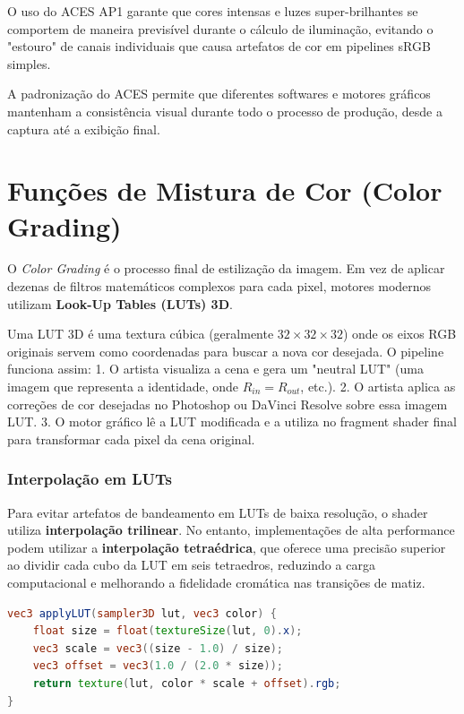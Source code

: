 O uso do ACES AP1 garante que cores intensas e luzes super-brilhantes se comportem de maneira previsível durante o cálculo de iluminação, evitando o "estouro" de canais individuais que causa artefatos de cor em pipelines sRGB simples.

A padronização do ACES permite que diferentes softwares e motores gráficos mantenham a consistência visual durante todo o processo de produção, desde a captura até a exibição final.

\section{Funções de Mistura de Cor (Color Grading)}

O \textit{Color Grading} é o processo final de estilização da imagem. Em vez de aplicar dezenas de filtros matemáticos complexos para cada pixel, motores modernos utilizam \textbf{Look-Up Tables (LUTs) 3D}.

Uma LUT 3D é uma textura cúbica (geralmente $32 \times 32 \times 32$) onde os eixos RGB originais servem como coordenadas para buscar a nova cor desejada.
O pipeline funciona assim:
1. O artista visualiza a cena e gera um "neutral LUT" (uma imagem que representa a identidade, onde $R_{in}=R_{out}$, etc.).
2. O artista aplica as correções de cor desejadas no Photoshop ou DaVinci Resolve sobre essa imagem LUT.
3. O motor gráfico lê a LUT modificada e a utiliza no fragment shader final para transformar cada pixel da cena original.

\subsubsection{Interpolação em LUTs}

Para evitar artefatos de bandeamento em LUTs de baixa resolução, o shader utiliza \textbf{interpolação trilinear}. No entanto, implementações de alta performance podem utilizar a \textbf{interpolação tetraédrica}, que oferece uma precisão superior ao dividir cada cubo da LUT em seis tetraedros, reduzindo a carga computacional e melhorando a fidelidade cromática nas transições de matiz.

\begin{lstlisting}[language=GLSL, caption=Amostragem de LUT 3D]
vec3 applyLUT(sampler3D lut, vec3 color) {
    float size = float(textureSize(lut, 0).x);
    vec3 scale = vec3((size - 1.0) / size);
    vec3 offset = vec3(1.0 / (2.0 * size));
    return texture(lut, color * scale + offset).rgb;
}
\end{lstlisting}

